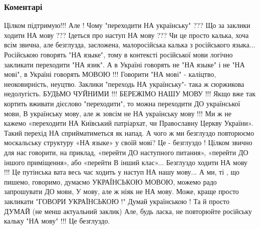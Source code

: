  
 
 
 
 
\subsubsection{Коментарі}
\label{sec:29_07_2021.fb.muharskij_antin.1.ukrainizacia_abo_smert.cmt}

\begin{itemize}
 

\obeycr
Цілком підтримую!!!
Але !
Чому
"переходити НА українську" ???
Що за заклики
ходити НА мову ???
Ідеться про наступ НА мову ???
Чи це просто
калька,
хоча всім звична,
але безглузда,
заєложена,
малоросійська калька
з російського языка...
Російською говорять "НА языке", тому в контексті російської мови логічно закликати переходити "НА язик".
А в Україні говорять не "НА языке" і не "НА мові",
в Україні говорять МОВОЮ !!!
Говорити "НА мові" - каліцтво, неоковирність, неуцтво.
Заклики "переходь НА українську"- така ж сюржикова недолугість.
БУДЬМО ЧУЙНИМИ !!!
БЕРЕЖІМО НАШУ МОВУ !!!
Якщо вже так кортить вживати дієслово "переходити",
то можна переходити
ДО української мови, В українську мову,
але ж зовсім не НА українську мову !!!
Ми ж не кажемо
«переходити НА Київський патріархат,
чи Православну Церкву України».
Такий перехід НА сприйматиметься як напад.
А чого ж ми безглуздо повторюємо
москальську структуру
«НА языке»
у своїй мові?
Це - безглуздо !
Цілком звично для нас говорити,
на приклад,
«перейти ДО наступного питання»,
«перейти ДО іншого приміщення»,
або
«перейти В інший клас»...
Безглуздо ходити НА мову !!!
Це путінська вата
весь час ходить у наступ
НА нашу мову...
А ми,
ті , що
пишемо,
говоримо,
думаємо
УКРАЇНСЬКОЮ МОВОЮ,
можемо радо запрошувати
ДО мови, У мову,
але ж ніяк не НА мову.
Може, краще просто закликати
"ГОВОРИ УКРАЇНСЬКОЮ !"
Думай українською !
Та й просто ДУМАЙ
(не менш актуальний заклик)
Але, будь ласка, не повторюйте російську кальку "НА мову" !!!
Це безглуздо.
\restorecr


\end{itemize}
